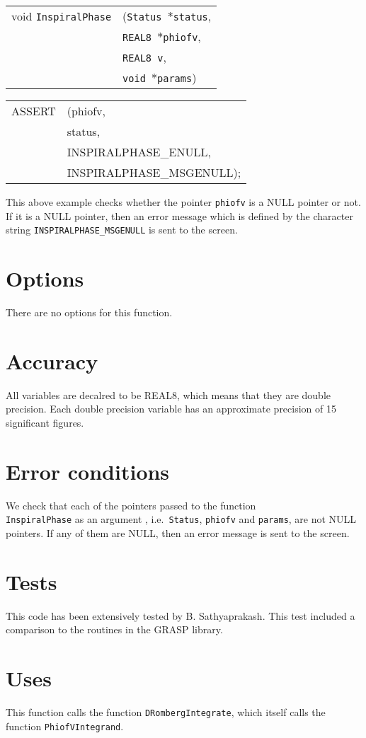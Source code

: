 \documentclass[12pt]{article}
\begin{document}
\vspace{5mm}

\begin{tabular}{ll}
void \texttt{InspiralPhase}&(\texttt{Status $\ast$status},     \\
                                   &\texttt{REAL8 $\ast$phiofv}, \\
                                   &\texttt{REAL8 v}, \\
                                   &\texttt{void $\ast$params})
\end{tabular}

\vspace{5mm}

\begin{tabular}{ll}
ASSERT & (phiofv,  \\
       &  status,    \\
       &  INSPIRALPHASE\_ENULL, \\
       &  INSPIRALPHASE\_MSGENULL);
\end{tabular}

\vspace{5mm}

This above example checks whether the pointer \texttt{phiofv} is a NULL pointer or not. If it is a NULL pointer, then an error message which is defined by the character string \texttt{INSPIRALPHASE\_MSGENULL} is sent to the screen.


\section{Options}

There are no options for this function.


\section{Accuracy}

All variables are decalred to be REAL8, which means that they are double precision.
Each double precision variable has an approximate precision of 15 significant figures.


\section{Error conditions}

We check that each of the pointers passed to the function \\ \texttt{InspiralPhase} as an argument , i.e.\ \texttt{Status}, \texttt{phiofv} and \texttt{params}, are not NULL pointers. If any of them are NULL, then an error message is sent to the screen.


\section{Tests}

This code has been extensively tested by B. Sathyaprakash. This test included a comparison to the routines in the GRASP library.

\section{Uses}

This function calls the function \texttt{DRombergIntegrate},  which itself calls the function \texttt{PhiofVIntegrand}.
\end{document}
